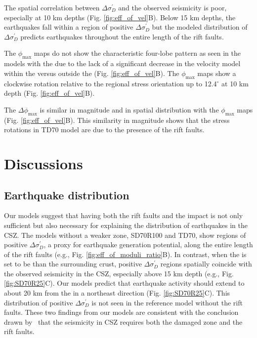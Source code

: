\documentclass[draft]{agujournal2018}
\begin{document}
The spatial correlation between $\Delta\sigma_{D}^{\prime}$ and the observed seismicity is poor, especially at 10 km depths (Fig. \ref{fig:eff_of_vel}B). Below 15 km depths, the earthquakes fall within a region of positive $\Delta\sigma_{D}^{\prime}$ but the modeled distribution of $\Delta\sigma_{D}^{\prime}$ predicts earthquakes throughout the entire length of the rift faults. 


The $\phi_{\max}$ maps do not show the characteristic four-lobe pattern as seen in the models with the  due to the lack of a significant decrease in the velocity model within the  versus outside the  (Fig. \ref{fig:eff_of_vel}B). The $\phi_{\max}$ maps show a clockwise rotation relative to the regional stress orientation up to 12.4$^\circ$ at 10 km depth (Fig. \ref{fig:eff_of_vel}B).

The $\Delta\phi_{\max}$ is similar in magnitude and in spatial distribution with the $\phi_{\max}$ maps (Fig. \ref{fig:eff_of_vel}B). This similarity in magnitude shows that the stress rotations in TD70 model are due to the presence of the rift faults.

\section{Discussions}

\subsection{Earthquake distribution}
Our models suggest that having both the rift faults and the impact  is not only sufficient but also necessary for explaining the distribution of earthquakes in the CSZ. The models without a weaker  zone, SD70R100 and TD70, show regions of positive $\Delta \sigma_{D}^{\prime}$, a proxy for earthquake generation potential, along the entire length of the rift faults (e.g., Fig. \ref{fig:eff_of_moduli_ratio}B). In contrast, when the  is set to be  than the surrounding crust, positive $\Delta \sigma_{D}^{\prime}$ regions spatially coincide with the observed seismicity in the CSZ, especially above 15 km depth (e.g., Fig. \ref{fig:SD70R25}C). Our models predict that earthquake activity should extend to about 20 km  from the  in a northeast direction (Fig. \ref{fig:SD70R25}C). This distribution of positive $\Delta \sigma_{D}^{\prime}$ is not seen in the reference model without the rift faults. These two findings from our models are consistent with the conclusion drawn by~\citet{Thomas_Powell_2017} that the seismicity in CSZ requires both the damaged  zone and the rift faults.
\end{document}
